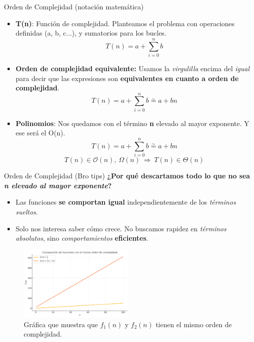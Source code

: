 \documentclass[aspectratio=169]{beamer}
\begin{document}
\begin{frame}{Orden de Complejidad (notación matemática)}
    \begin{itemize}
        \item \textbf{T(n)}: Función de complejidad. Planteamos el problema con operaciones definidas (a, b, c...), y sumatorios para los bucles.
        \[
            T(n) = a + \sum_{i=0}^n b
        \]
        \item \textbf{Orden de complejidad equivalente:} Usamos la \textit{virgulilla} encima del \textit{igual} para decir que las expresiones son \textbf{equivalentes en cuanto a orden de complejidad}.
        \[
        T(n) = a + \sum_{i=0}^n b \overset{\sim}{=} a + bn
        \]
        \item \textbf{Polinomios}: Nos quedamos con el término \textbf{n} elevado al mayor exponente. Y ese será el O(n).
        \[
            T(n) = a + \sum_{i=0}^n b \overset{\sim}{=} a + bn
            \]
            \[
            T(n) \in \mathcal{O}(n), \ \Omega(n) \ \Rightarrow \ T(n) \in \Theta(n)
        \]
    \end{itemize}
\end{frame}

\begin{frame}{Orden de Complejidad (Bro tips)}
\textbf{¿Por qué descartamos todo lo que no sea \textit{n elevado al mayor exponente}?}
    \begin{itemize}
        \item Las funciones \textbf{se comportan igual} independientemente de los \textit{términos sueltos}.
        \item Solo nos interesa saber cómo crece. No buscamos rapidez en \textit{términos absolutos}, sino \textit{comportamientos} \textbf{eficientes}.
    \end{itemize}

\begin{figure}[h!]
    \centering
    \includegraphics[width=0.5\textwidth]{orden-n.png}
    \caption{Gráfica que muestra que \(f_1(n)\) y \(f_2(n)\) tienen el mismo orden de complejidad.}
    \label{fig:orden-n}
\end{figure}
\end{frame}
\end{document}
